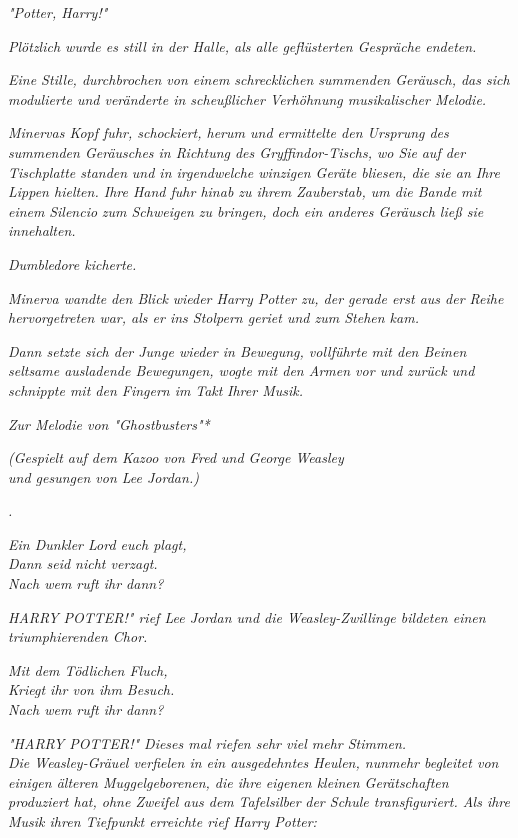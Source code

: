 {\emph{"Potter, Harry!"}

\emph{Plötzlich wurde es still in der Halle, als alle geflüsterten Gespräche endeten.}

\emph{Eine Stille, durchbrochen von einem schrecklichen summenden Geräusch, das sich modulierte und veränderte in scheußlicher Verhöhnung musikalischer Melodie.}

\emph{Minervas Kopf fuhr, schockiert, herum und ermittelte den Ursprung des summenden Geräusches in Richtung des Gryffindor-Tischs, wo Sie} \emph{\emph{auf der Tischplatte standen}} \emph{und in irgendwelche winzigen Geräte bliesen, die sie an Ihre Lippen hielten. Ihre Hand fuhr hinab zu ihrem Zauberstab, um die Bande mit einem} \emph{\emph{Silencio}} \emph{zum Schweigen zu bringen, doch ein anderes Geräusch ließ sie innehalten.}

\emph{Dumbledore kicherte.}

\emph{Minerva wandte} \emph{den Blick} \emph{wieder Harry Potter zu, der gerade erst aus der Reihe hervorgetreten war, als er ins Stolpern geriet und zum Stehen kam.}

\emph{Dann setzte sich der Junge wieder in Bewegung, vollführte mit den Beinen seltsame ausladende Bewegungen, wogte mit den Armen vor und zurück und schnippte mit den Fingern im} \emph{Takt} \emph{Ihrer Musik.}

\emph{Zur Melodie von "Ghostbusters"*}

\emph{(Gespielt auf dem Kazoo von Fred und George Weasley\\ und gesungen von Lee Jordan.)}

\emph{.}

\emph{Ein Dunkler Lord euch plagt,\\ Dann seid nicht verzagt.\\ Nach wem ruft ihr dann?}

\emph{HARRY POTTER!" rief Lee Jordan und die Weasley-Zwillinge bildeten einen triumphierenden Chor.}

\emph{Mit dem Tödlichen Fluch,\\ Kriegt ihr von ihm Besuch.\\ Nach wem ruft ihr dann?}

\emph{"HARRY POTTER!" Dieses mal riefen sehr viel mehr Stimmen.}\\ \emph{Die Weasley-Gräuel verfielen in ein ausgedehntes Heulen, nunmehr begleitet von einigen älteren Muggelgeborenen, die ihre eigenen kleinen Gerätschaften produziert hat, ohne Zweifel aus dem} \emph{Tafelsilber} \emph{der Schule transfiguriert. Als ihre Musik ihren Tiefpunkt erreichte rief Harry Potter:}

}
